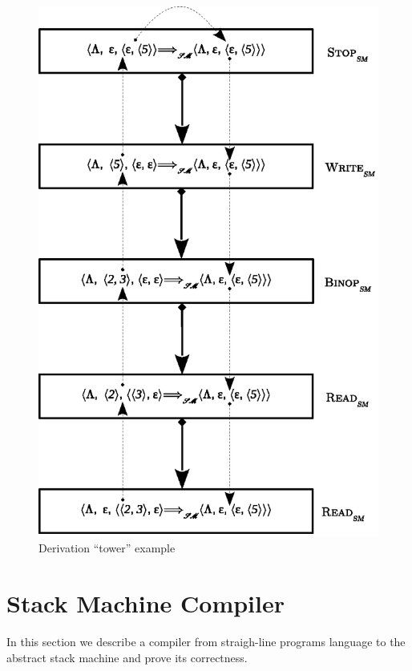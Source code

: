 \begin{figure}[t]
  \centering
  \includegraphics[scale=0.8]{images/05-01.eps}
  \caption{Derivation ``tower'' example}
  \label{derivation-tower}
\end{figure}

\section{Stack Machine Compiler}

In this section we describe a compiler from straigh-line programs language to the abstract stack machine and prove its correctness.
